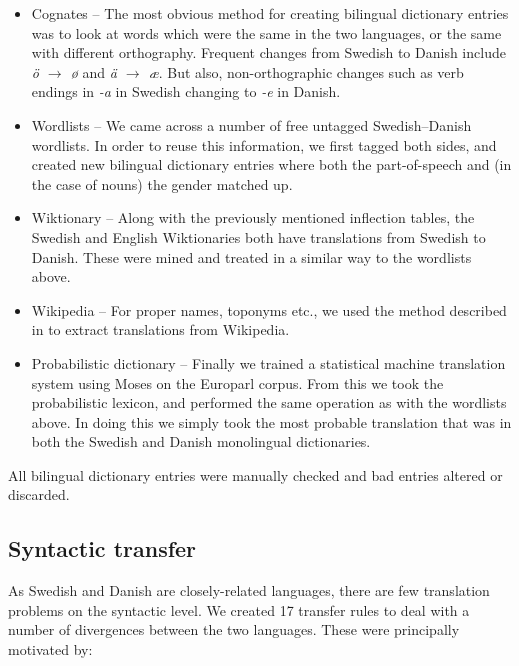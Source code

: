 \documentclass[11pt]{article}
\begin{document}
\begin{itemize} 
  \item Cognates -- The most obvious method for creating bilingual dictionary entries
     was to look at words which were the same in the two languages, or the same with
     different orthography. Frequent changes from Swedish to Danish include \emph{ö $\rightarrow$ ø}
     and \emph{ä $\rightarrow$ æ}. But also, non-orthographic changes such as verb endings
     in \emph{-a} in Swedish changing to \emph{-e} in Danish.
  \item Wordlists -- We came across a number of free untagged Swedish--Danish wordlists. In order
     to reuse this information, we first tagged both sides, and created new bilingual
     dictionary entries where both the part-of-speech and (in the case of nouns) the gender
     matched up. 
  \item Wiktionary -- Along with the previously mentioned inflection tables, the Swedish and 
     English Wiktionaries both have translations from Swedish to Danish. These were mined and 
     treated in a similar way to the wordlists above.
  \item Wikipedia -- For proper names, toponyms etc., we used the method described in \cite{tyers2008}
     to extract translations from Wikipedia.
  \item Probabilistic dictionary -- Finally we trained a statistical machine translation system
     using Moses \citep{Koehn2007} on the Europarl \citep{Koehn2005} corpus. From this we took
     the probabilistic lexicon, and performed the same operation as with the wordlists above. In doing
     this we simply took the most probable translation that was in both the Swedish and Danish 
     monolingual dictionaries.
\end{itemize}

All bilingual dictionary entries were manually checked and bad entries altered or discarded.

\subsection{Syntactic transfer}

As Swedish and Danish are closely-related languages, there are few translation problems
on the syntactic level. We created 17 transfer rules to deal with a number of divergences 
between the two languages. These were principally motivated by:
\end{document}

